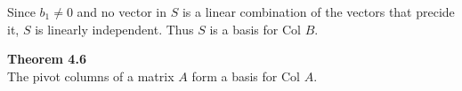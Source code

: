 \documentclass{article}
\begin{document}
  Since $ b_1 \neq 0 $ and no vector in $ S $ is a linear combination of the vectors that precide it, $ S $ is linearly independent. Thus $ S $ is a basis for Col $ B $.   
  
  \textbf{Theorem 4.6}\\
  The pivot columns of a matrix $ A $ form a basis for Col $ A $.


  
  
\end{document}
